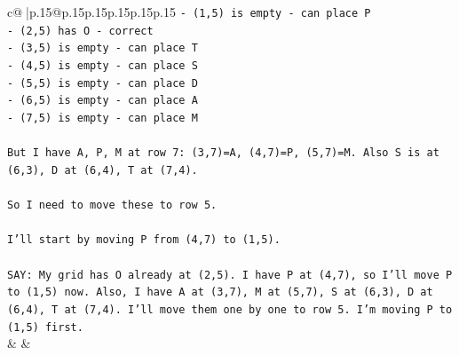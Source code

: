 \documentclass{article}
\begin{document}
{\begin{supertabular}{c@{$\;$}|p{.15\linewidth}@{}p{.15\linewidth}p{.15\linewidth}p{.15\linewidth}p{.15\linewidth}p{.15\linewidth}}
{{{\texttt{{-} (1,5) is empty {-} can place P} \\
\texttt{{-} (2,5) has O {-} correct} \\
\texttt{{-} (3,5) is empty {-} can place T} \\
\texttt{{-} (4,5) is empty {-} can place S} \\
\texttt{{-} (5,5) is empty {-} can place D} \\
\texttt{{-} (6,5) is empty {-} can place A} \\
\texttt{{-} (7,5) is empty {-} can place M} \\
\\ 
\texttt{But I have A, P, M at row 7: (3,7)=A, (4,7)=P, (5,7)=M. Also S is at (6,3), D at (6,4), T at (7,4).} \\
\\ 
\texttt{So I need to move these to row 5.} \\
\\ 
\texttt{I'll start by moving P from (4,7) to (1,5).} \\
\\ 
\texttt{SAY: My grid has O already at (2,5). I have P at (4,7), so I'll move P to (1,5) now. Also, I have A at (3,7), M at (5,7), S at (6,3), D at (6,4), T at (7,4). I'll move them one by one to row 5. I'm moving P to (1,5) first.} \\
            }
        }
    }
    & & \\ \\


\end{supertabular}}
\end{document}
